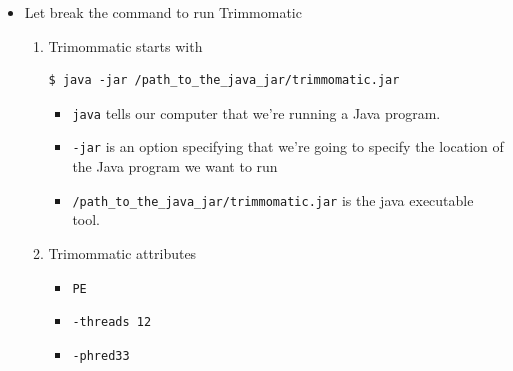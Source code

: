 \documentclass{article}
\begin{document}
\begin{itemize}
\begin{enumerate}
\begin{verbatim}
TrimmomaticPE: Started with arguments:
 -threads 12 -phred33 /home/henry/Desktop/RNA_Seq_Differential_Expressions/FASTQ_Files/paired_end/ERR950159_1.fastq
 /home/henry/Desktop/RNA_Seq_Differential_Expressions/FASTQ_Files/paired_end/ERR950159_2.fastq 
 /home/henry/Desktop/RNA_Seq_Differential_Expressions/FASTQ_Files/paired_end/output_forward_paired_ERR950159_1.fastq 
 /home/henry/Desktop/RNA_Seq_Differential_Expressions/FASTQ_Files/paired_end/output_forward_unpaired_ERR950159_1.fastq 
 /home/henry/Desktop/RNA_Seq_Differential_Expressions/FASTQ_Files/paired_end/output_reverse_paired_ERR950159_2.fastq
 /home/henry/Desktop/RNA_Seq_Differential_Expressions/FASTQ_Files/paired_end/output_reverse_unpaired_ERR950159_2.fastq 
 ILLUMINACLIP:/usr/local/TRIMHOME/adapters/TruSeq3-PE.fa:2:30:10 LEADING:3 TRAILING:3 SLIDINGWINDOW:4:15 MINLEN:36
Using PrefixPair: 'TACACTCTTTCCCTACACGACGCTCTTCCGATCT' and 'GTGACTGGAGTTCAGACGTGTGCTCTTCCGATCT'
ILLUMINACLIP: Using 1 prefix pairs, 0 forward/reverse sequences, 0 forward only sequences, 0 reverse only sequences
Input Read Pairs: 21433074 Both Surviving: 17241380 (80.44%) Forward Only Surviving: 3912653 (18.26%) Reverse Only Surviving: 143989 (0.67%) Dropped: 135052 (0.63%)
TrimmomaticPE: Completed successfully
\end{verbatim}
\normalsize
\end{enumerate}
\item Let break the command to run Trimmomatic 
\begin{enumerate}
 \item Trimommatic starts with 
 \scriptsize  
\begin{verbatim}
$ java -jar /path_to_the_java_jar/trimmomatic.jar
\end{verbatim}
\normalsize
\begin{itemize}
 \item \verb+java+ tells our computer that we’re running a Java program. 
 \item \verb+-jar+ is an option specifying that we’re going to specify the location of the Java program we want to run
 \item \verb+/path_to_the_java_jar/trimmomatic.jar+ is the java executable tool.
\end{itemize}
\item Trimommatic attributes
\begin{itemize}
 \item \verb+PE+
 \item \verb+-threads 12+
 \item \verb+-phred33+

\end{itemize}
\end{enumerate}
\end{itemize}
\end{document}
